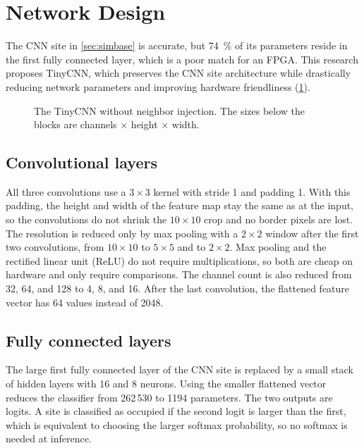 \section{Network Design}\label{sec:network}

The CNN site in \cref{sec:simbase} is accurate, but \SI{74}{\percent} of its parameters reside in the first fully connected layer, which is a poor match for an FPGA. This research proposes TinyCNN, which preserves the CNN site architecture while drastically reducing network parameters and improving hardware friendliness (\cref{fig:tinycnn}).

\begin{figure}[H]
    \centering
    \resizebox{\textwidth}{!}{}
    \caption[The TinyCNN without neighbor injection.]{The TinyCNN without neighbor injection. The sizes below the blocks are channels $\times$ height $\times$ width.}
    \label{fig:tinycnn}
\end{figure}

\subsection{Convolutional layers} All three convolutions use a $3\times3$ kernel with stride 1 and padding 1. With this padding, the height and width of the feature map stay the same as at the input, so the convolutions do not shrink the $10\times10$ crop and no border pixels are lost. The resolution is reduced only by max pooling with a $2\times2$ window after the first two convolutions, from $10\times10$ to $5\times5$ and to $2\times2$. Max pooling and the rectified linear unit (ReLU) do not require multiplications, so both are cheap on hardware and only require comparisons. The channel count is also reduced from 32, 64, and 128 to 4, 8, and 16. After the last convolution, the flattened feature vector has 64 values instead of 2048.

\subsection{Fully connected layers} The large first fully connected layer of the CNN site is replaced by a small stack of hidden layers with 16 and 8 neurons. Using the smaller flattened vector reduces the classifier from 262\,530 to 1194 parameters. The two outputs are logits. A site is classified as occupied if the second logit is larger than the first, which is equivalent to choosing the larger softmax probability, so no softmax is needed at inference.

